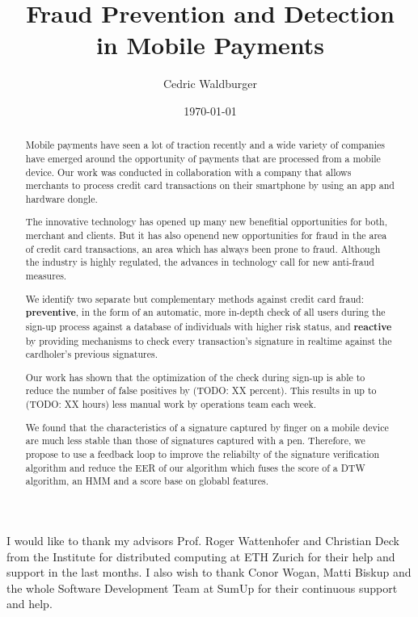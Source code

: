 \documentclass[a4paper, oneside]{csthesis}
\title{Fraud Prevention and Detection\\[5pt] in Mobile Payments}
\author{Cedric Waldburger}
\institute{Distributed Computing Group \\[2pt]
Computer Engineering and Networks Laboratory \\[2pt]
ETH Zurich}
\date{\today}
\begin{document}
\frontmatter
\maketitle %

\cleardoublepage

\begin{acknowledgements}

  I would like to thank my advisors Prof. Roger Wattenhofer and Christian Deck from the Institute for distributed computing at ETH Zurich for their help and support in the last months. I also wish to thank Conor Wogan, Matti Biskup and the whole Software Development Team at SumUp for their continuous support and help.

\end{acknowledgements}


\begin{abstract}
    Mobile payments have seen a lot of traction recently and a wide variety of companies have emerged around the opportunity of payments that are processed from a mobile device. Our work was conducted in collaboration with a company that allows merchants to process credit card transactions on their smartphone by using an app and hardware dongle.

    The innovative technology has opened up many new benefitial opportunities for both, merchant and clients. But it has also openend new opportunities for fraud in the area of credit card transactions, an area which has always been prone to fraud. Although the industry is highly regulated, the advances in technology call for new anti-fraud measures.

    We identify two  separate but complementary methods against credit card fraud: \textbf{preventive}, in the form of an automatic, more in-depth check of all users during the sign-up process against a database of individuals with higher risk status, and \textbf{reactive} by providing mechanisms to check every transaction's signature in realtime against the cardholer's previous signatures.

    Our work has shown that the optimization of the check during sign-up is able to reduce the number of false positives by (TODO: XX percent). This results in up to (TODO: XX hours) less manual work by operations team each week.

    We found that the characteristics of a signature captured by finger on a mobile device are much less stable than those of signatures captured with a pen. Therefore, we propose to use a feedback loop to improve the reliabilty of the signature verification algorithm and reduce the EER of our algorithm which fuses the score of a DTW algorithm, an HMM and a score base on globabl features.

\end{abstract}
\end{document}
